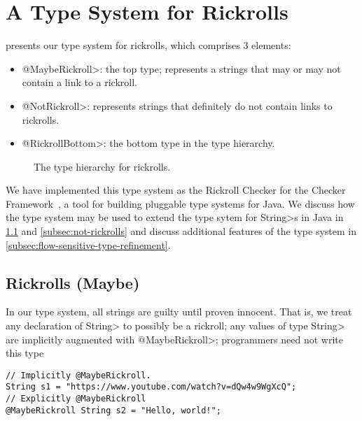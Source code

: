 \section{A Type System for Rickrolls}
\label{sec:rickroll-type-system}

 presents our type system for rickrolls, which
comprises 3 elements:

\begin{itemize}
  \item \<@MaybeRickroll>: the top type; represents a strings that may or may
    not contain a link to a rickroll.
  \item \<@NotRickroll>: represents strings that definitely do not contain
    links to rickrolls.
  \item \<@RickrollBottom>: the bottom type in the type hierarchy.
\end{itemize}

\begin{figure}[ht!]
    \centering
    
    \postfigurespace
    \caption{The type hierarchy for rickrolls.}
    \label{fig:rickroll-type-system}
\end{figure}

We have implemented this type system as the Rickroll Checker for the Checker
Framework~\cite{CheckerFrameworkManualNoYear}, a tool for building pluggable
type systems for Java.
We discuss how the type system may be used to extend the type sytem for
\<String>s in Java in \cref{subsec:rickrolls} and \cref{subsec:not-rickrolls}
and discuss additional features of the type system in \cref{subsec:flow-sensitive-type-refinement}.

\subsection{Rickrolls (Maybe)}
\label{subsec:rickrolls}

In our type system, all strings are guilty until proven innocent.
That is, we treat any declaration of \<String> to possibly be a rickroll;
any values of type \<String> are implicitly augmented with
\<@MaybeRickroll>; programmers need not write this type

\prelistingspace
\begin{lstlisting}[frame=tb]
// Implicitly @MaybeRickroll.
String s1 = "https://www.youtube.com/watch?v=dQw4w9WgXcQ";
// Explicitly @MaybeRickroll
@MaybeRickroll String s2 = "Hello, world!";
\end{lstlisting}
\postlistingspace

